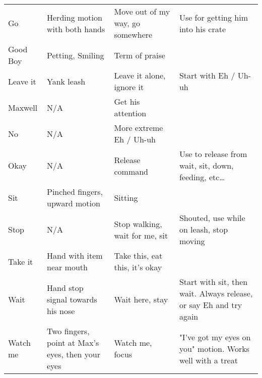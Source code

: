\documentclass[pdftex,12pt]{article}
\begin{document}
\begin{table}[H]
\begin{adjustwidth}{-3.5cm}{-3.5cm}
\begin{center}
\begin{tabular}{lp{11em}p{11em}p{11em}}
        Go          & Herding motion with both hands                   & Move out of my way, go somewhere                      & Use for getting him into his crate                                 \\
        Good Boy    & Petting, Smiling                                 & Term of praise                                        &                                                                    \\
        Leave it    & Yank leash                                       & Leave it alone, ignore it                             & Start with Eh / Uh-uh                                              \\
        Maxwell     & N/A                                              & Get his attention                                     &                                                                    \\
        No          & N/A                                              & More extreme Eh / Uh-uh                               &                                                                    \\
        Okay        & N/A                                              & Release
        command                                       & Use to release from
        wait, sit, down, feeding, etc\ldots                \\
        Sit         & Pinched fingers, upward motion                   & Sitting                                               &                                                                    \\
        Stop        & N/A                                              & Stop walking, wait for me, sit                        & Shouted, use while on leash, stop moving                           \\
        Take it     & Hand with item near mouth                        & Take this, eat this, it's okay                        &                                                                    \\
        Wait        & Hand stop signal towards his nose                & Wait here, stay                                       & Start with sit, then wait. Always release, or say Eh and try again \\
        Watch me    & Two fingers, point at Max's eyes, then your eyes & Watch me, focus                                       & "I've got my eyes on you" motion. Works well with a treat         
    \end{tabular}
\end{center}
\end{adjustwidth}
\end{table}
\end{document}
